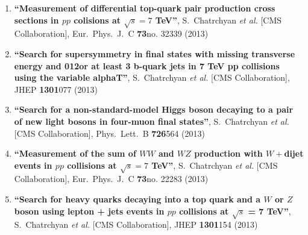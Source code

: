 \begin{enumerate}
\item%
{\bf ``Measurement of differential top-quark pair production cross sections in $pp$ colisions at $\sqrt{s}=7$ TeV''}, 
  S.~Chatrchyan {\it et al.}  [CMS Collaboration], 
Eur.\ Phys.\ J.\ C {\bf 73}no. 32339 (2013) %


\item%
{\bf ``Search for supersymmetry in final states with missing transverse energy and 012or at least 3 b-quark jets in 7 TeV pp collisions using the variable alphaT''}, 
  S.~Chatrchyan {\it et al.}  [CMS Collaboration], 
JHEP {\bf 1301}077 (2013) %


\item%
{\bf ``Search for a non-standard-model Higgs boson decaying to a pair of new light bosons in four-muon final states''}, 
  S.~Chatrchyan {\it et al.}  [CMS Collaboration], 
Phys.\ Lett.\ B {\bf 726}564 (2013) %


\item%
{\bf ``Measurement of the sum of $W W$ and $WZ$ production with $W+$dijet events in $pp$ collisions at $\sqrt{s}=7$ TeV''}, 
  S.~Chatrchyan {\it et al.}  [CMS Collaboration], 
Eur.\ Phys.\ J.\ C {\bf 73}no. 22283 (2013) %


\item%
{\bf ``Search for heavy quarks decaying into a top quark and a $W$ or $Z$ boson using lepton + jets events in $pp$ collisions at $\sqrt{s}$ = 7 TeV''}, 
  S.~Chatrchyan {\it et al.}  [CMS Collaboration], 
JHEP {\bf 1301}154 (2013) %



\end{enumerate}
